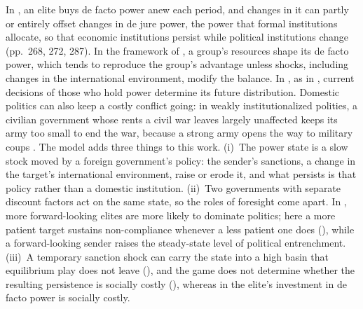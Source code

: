  In \citet{AcemogluRobinson2008}, an elite buys de facto power anew
each period, and changes in it can partly or entirely offset changes in de jure power,
the power that formal institutions allocate, so that economic institutions persist
while political institutions change (pp.~268, 272, 287). In the framework of
\citet[Section~1.2]{AcemogluJohnsonRobinson2005}, a group's resources shape its de facto
power, which tends to reproduce the group's advantage unless shocks, including changes
in the international environment, modify the balance. In
\citet{AcemogluEgorovSonin2012,AcemogluEgorovSonin2015}, as in \citet{BaiLagunoff2011},
current decisions of those who hold power determine its future distribution. Domestic
politics can also keep a costly conflict going: in weakly institutionalized polities,
a civilian government whose rents a civil war leaves largely unaffected keeps its army
too small to end the war, because a strong army opens the way to military coups
\citep[p.~664]{AcemogluTicchiVindigni2010}. The model adds three things to this work.
(i)~The power state is a slow stock moved by a foreign government's policy: the
sender's sanctions, a change in the target's international environment, raise or erode
it, and what persists is that policy rather than a domestic institution. (ii)~Two
governments with separate discount factors act on the same state, so the roles of
foresight come apart. In \citet[p.~287]{AcemogluRobinson2008}, more forward-looking
elites are more likely to dominate politics; here a more patient target sustains
non-compliance whenever a less patient one does (),
while a forward-looking sender raises the steady-state level of political
entrenchment. (iii)~A temporary sanction shock can carry the state into a high basin
that equilibrium play does not leave (), and the game does not
determine whether the resulting persistence is socially costly
(), whereas in
\citet[p.~279]{AcemogluRobinson2008} the elite's investment in de facto power is
socially costly.

